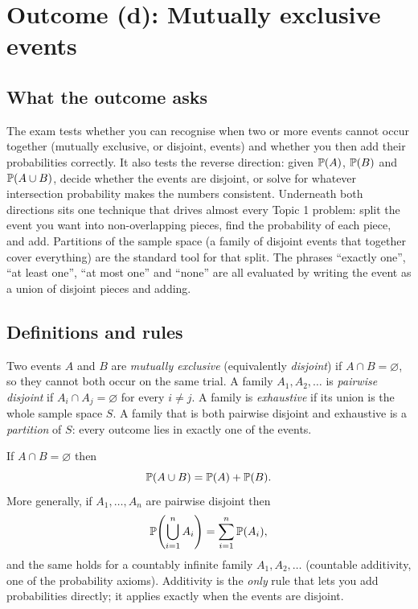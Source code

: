 \section{Outcome (d): Mutually exclusive events}

\subsection{What the outcome asks}

The exam tests whether you can recognise when two or more events cannot occur together
(mutually exclusive, or disjoint, events) and whether you then add their probabilities
correctly. It also tests the reverse direction: given $\mathbb{P}(A)$, $\mathbb{P}(B)$ and
$\mathbb{P}(A \cup B)$, decide whether the events are disjoint, or solve for whatever
intersection probability makes the numbers consistent. Underneath both directions sits one
technique that drives almost every Topic 1 problem: split the event you want into
non-overlapping pieces, find the probability of each piece, and add. Partitions of the
sample space (a family of disjoint events that together cover everything) are the standard
tool for that split. The phrases ``exactly one'', ``at least one'', ``at most one'' and
``none'' are all evaluated by writing the event as a union of disjoint pieces and adding.

\subsection{Definitions and rules}

Two events $A$ and $B$ are \emph{mutually exclusive} (equivalently \emph{disjoint}) if
$A \cap B = \varnothing$, so they cannot both occur on the same trial. A family
$A_1, A_2, \dots$ is \emph{pairwise disjoint} if $A_i \cap A_j = \varnothing$ for every
$i \neq j$. A family is \emph{exhaustive} if its union is the whole sample space $S$. A
family that is both pairwise disjoint and exhaustive is a \emph{partition} of $S$: every
outcome lies in exactly one of the events.

\begin{keyfact}
If $A \cap B = \varnothing$ then
\[
\mathbb{P}(A \cup B) = \mathbb{P}(A) + \mathbb{P}(B).
\]
More generally, if $A_1, \dots, A_n$ are pairwise disjoint then
\[
\mathbb{P}\!\left(\bigcup_{i=1}^{n} A_i\right) = \sum_{i=1}^{n} \mathbb{P}(A_i),
\]
and the same holds for a countably infinite family $A_1, A_2, \dots$ (countable
additivity, one of the probability axioms). Additivity is the \emph{only} rule that lets you
add probabilities directly; it applies exactly when the events are disjoint.
\end{keyfact}

